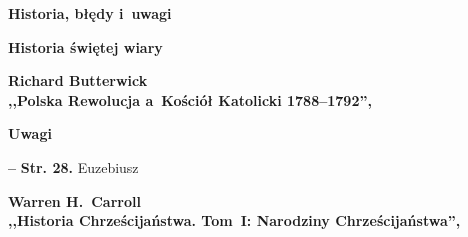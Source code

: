 \documentclass[a4paper,11pt]{article}  %
\newcommand{\spaceTwo}{2em}
\newcommand{\spaceThree}{1em}
\newcommand{\tb}{\textbf}
\newcommand{\noi}{\noindent}
\newcommand{\start}{\noi \tb{--} {}}
\newcommand{\Str}[1]{\tb{Str. #1.}}
\newcommand{\Center}[1]{\begin{center} #1 \end{center}}
\newcommand{\CenterTB}[1]{\Center{\tb{#1}}}
\newcommand{\Main}[1]{ \begin{center} {\LARGE \tb{#1} } \end{center} }
\newcommand{\Field}[1]{ \begin{center} {\Large \tb{#1} } \end{center} }
\newcommand{\Work}[1]{ \begin{center} {\large \tb{#1}} \end{center} }
\begin{document}



\Main{Historia, błędy i~uwagi}

\vspace{\spaceTwo} \vspace{\spaceThree}



\Field{Historia świętej wiary}

\vspace{\spaceTwo} %



\Work{
  Richard Butterwick \\
  ,,Polska Rewolucja a~Kościół Katolicki 1788--1792'',
  \cite{ButterwickPolskaRewolucjaAKosciolKatolicki12} }


\CenterTB{Uwagi}

\start \Str{28} Euzebiusz \\




\vspace{\spaceTwo}





\newpage
\Work{
  Warren H.~Carroll \\
  ,,Historia Chrześcijaństwa. Tom~I: Narodziny Chrześcijaństwa'',
  \cite{CarrollHistoriaChrzecijanstwaTomI09} }
\end{document}
